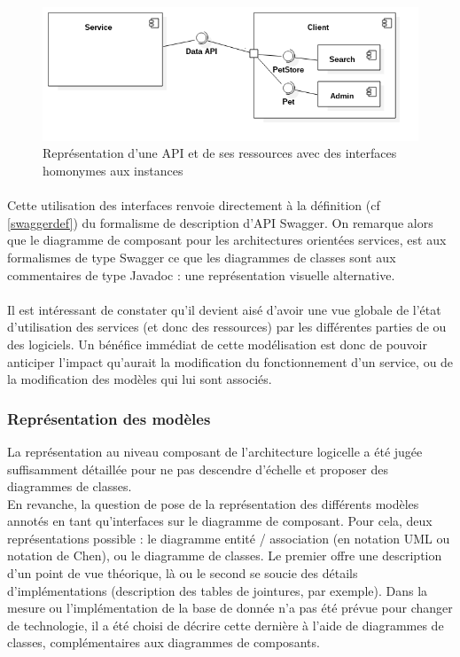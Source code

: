         \begin{figure}[h]
            \centering
            \includegraphics[scale=0.6]{./assets/UML/component2.png}
            \caption{Représentation d'une API et de ses ressources avec des interfaces homonymes aux instances}
        \end{figure}

        \paragraph{}
            Cette utilisation des interfaces renvoie directement à la définition (cf \ref{swaggerdef})
            du formalisme de description d'API Swagger. On remarque alors que le diagramme de composant pour
            les architectures orientées services, est aux formalismes de type Swagger ce que les diagrammes
            de classes sont aux commentaires de type Javadoc : une représentation visuelle alternative.

        \paragraph{}
            Il est intéressant de constater qu'il devient aisé d'avoir une vue globale de l'état
            d'utilisation des services (et donc des ressources) par les différentes parties de ou des
            logiciels. Un bénéfice immédiat de cette modélisation est donc de pouvoir anticiper l'impact
            qu'aurait la modification du fonctionnement d'un service, ou de la modification des modèles
            qui lui sont associés.

    \subsubsection{Représentation des modèles}
        La représentation au niveau composant de l'architecture logicelle a été jugée suffisamment
        détaillée pour ne pas descendre d'échelle et proposer des diagrammes de classes.\\
        En revanche, la question de pose de la représentation des différents modèles annotés en tant
        qu'interfaces sur le diagramme de composant. Pour cela, deux représentations possible :
        le diagramme entité / association (en notation UML ou notation de Chen), ou le diagramme de
        classes. Le premier offre une description d'un point de vue théorique, là ou le second se
        soucie des détails d'implémentations (description des tables de jointures, par exemple).
        Dans la mesure ou l'implémentation de la base de donnée n'a pas été prévue pour changer de
        technologie, il a été choisi de décrire cette dernière à l'aide de diagrammes de classes,
        complémentaires aux diagrammes de composants.

